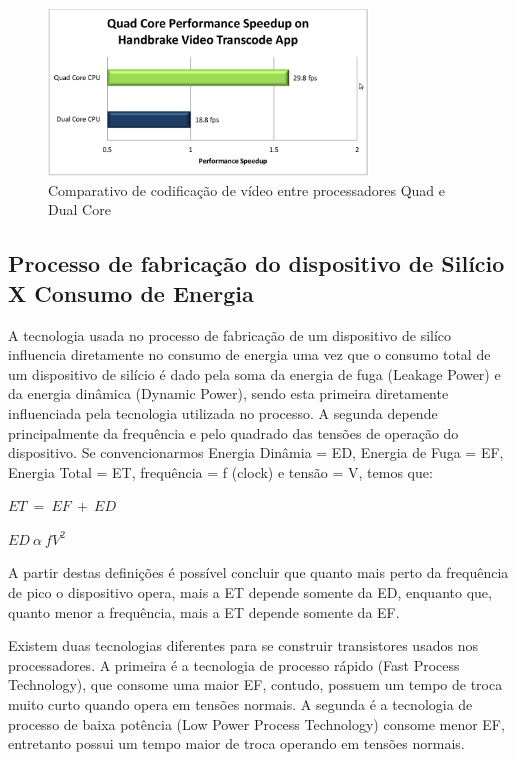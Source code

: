 \documentclass[article]{IEEEtran}
\begin{document}
\begin{figure}[ht]
  \centering
  \includegraphics[width=8.5cm]{./pictures/QuadCoreVideo.png}
  \caption{Comparativo de codifica\c{c}\~ao de v\'ideo entre processadores Quad e Dual Core}
  \label{fig:quadcorevideo}
\end{figure}

\subsection{Processo de fabrica\c{c}\~ao do dispositivo de Sil\'icio X Consumo de Energia}

A tecnologia usada no processo de fabrica\c{c}\~ao de um dispositivo de sil\'ico influencia diretamente no consumo de energia uma vez que o consumo total de um dispositivo de sil\'icio \'e dado pela soma da energia de fuga (Leakage Power) e da energia din\^amica (Dynamic Power), sendo esta primeira diretamente influenciada pela tecnologia utilizada no processo. A segunda depende principalmente da frequ\^encia e pelo quadrado das tens\~oes de opera\c{c}\~ao do dispositivo. Se convencionarmos Energia Din\^amia = ED, Energia de Fuga = EF, Energia Total = ET, frequ\^encia = f (clock) e tens\~ao = V, temos que:
 
\( ET\ =\ EF\ +\ ED \)

\( ED\  \alpha\  fV^2\)
	
A partir destas defini\c{c}\~oes \'e poss\'ivel concluir que quanto mais perto da frequ\^encia de pico o dispositivo opera, mais a ET depende somente da ED, enquanto que, quanto menor a  frequ\^encia, mais a ET depende somente da EF.

Existem duas tecnologias diferentes para se construir transistores usados nos processadores. A primeira \'e a tecnologia de processo r\'apido (Fast Process Technology), que consome uma maior EF, contudo, possuem um tempo de troca muito curto quando opera em tens\~oes normais. A segunda \'e a tecnologia de processo de baixa pot\^encia (Low Power Process Technology) consome menor EF, entretanto possui um tempo maior de troca operando em tens\~oes normais.
\end{document}
